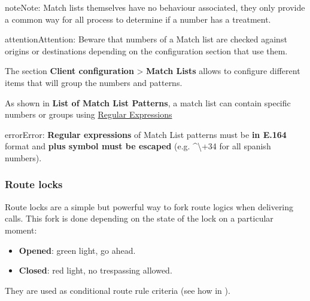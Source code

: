 \documentclass[letterpaper,10pt,english]{sphinxmanual}
\begin{document}
\begin{notice}{note}{Note:}
Match lists themselves have no behaviour associated, they only provide
a common way for all process to determine if a number has a treatment.
\end{notice}

\begin{notice}{attention}{Attention:}
Beware that numbers of a Match list are checked against origins
or destinations depending on the configuration section that use them.
\end{notice}

The section \textbf{Client configuration} \textgreater{} \textbf{Match Lists} allows to configure
different items that will group the numbers and patterns.

As shown in \textbf{List of Match List Patterns}, a match list can contain specific numbers or groups using
\href{http://php.net/manual/en/reference.pcre.pattern.syntax.php}{Regular Expressions}

\begin{notice}{error}{Error:}
\textbf{Regular expressions} of Match List patterns must be \textbf{in E.164} format and \textbf{plus symbol must be
escaped} (e.g. \textasciicircum{}\textbackslash{}+34 for all spanish numbers).
\end{notice}
\label{administration_portal/client/vpbx/routing_tools/route_locks:route-locks}

\subsubsection{Route locks}
\label{administration_portal/client/vpbx/routing_tools/route_locks:id2}\label{administration_portal/client/vpbx/routing_tools/route_locks:route-locks}\label{administration_portal/client/vpbx/routing_tools/route_locks::doc}\label{administration_portal/client/vpbx/routing_tools/route_locks:id1}
Route locks are a simple but powerful way to fork route logics when delivering calls. This fork is done depending on the
state of the lock on a particular moment:
\begin{itemize}
\item {} 
\textbf{Opened}: green light, go ahead.

\item {} 
\textbf{Closed}: red light, no trespassing allowed.

\end{itemize}

They are used as conditional route rule criteria (see how in {\hyperref[administration_portal/client/vpbx/routing_endpoints/conditional_routes:conditional\string-routes]{}}).
\end{document}
